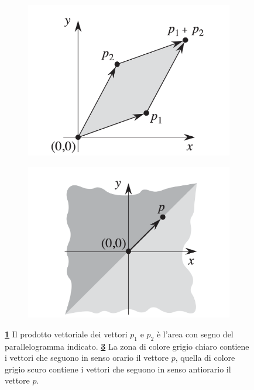 \documentclass[12pt,a4paper]{report}
\begin{document}
\begin{figure}[ht]
\centering
 \begin{subfigure}{.4\textwidth}
    \centering
    \includegraphics[width=1\linewidth]{crossproduct.png}
    \caption{}
    \label{fig:crossproduct}
 \end{subfigure}
 \begin{subfigure}{.4\textwidth}
    \centering
    \includegraphics[width=1\linewidth]{crossproductturn.png}
    \caption{}
    \label{fig:crossproductturn}
 \end{subfigure}
 \caption{\textbf{\ref{fig:crossproduct}} Il prodotto vettoriale dei vettori $p_1$ e $p_2$ è l'area con segno del parallelogramma indicato. \textbf{\ref{fig:crossproductturn}} La zona di colore grigio chiaro contiene i vettori che seguono in senso orario il vettore $p$, quella di colore grigio scuro contiene i vettori che seguono in senso antiorario il vettore $p$.}
\end{figure}
\end{document}
